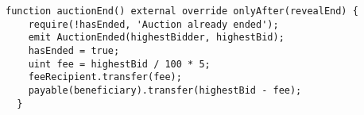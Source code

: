 \begin{lstlisting}[language=Solidity]
  function auctionEnd() external override onlyAfter(revealEnd) {
    require(!hasEnded, 'Auction already ended');
    emit AuctionEnded(highestBidder, highestBid);
    hasEnded = true;
    uint fee = highestBid / 100 * 5;
    feeRecipient.transfer(fee);
    payable(beneficiary).transfer(highestBid - fee);
  }
\end{lstlisting}